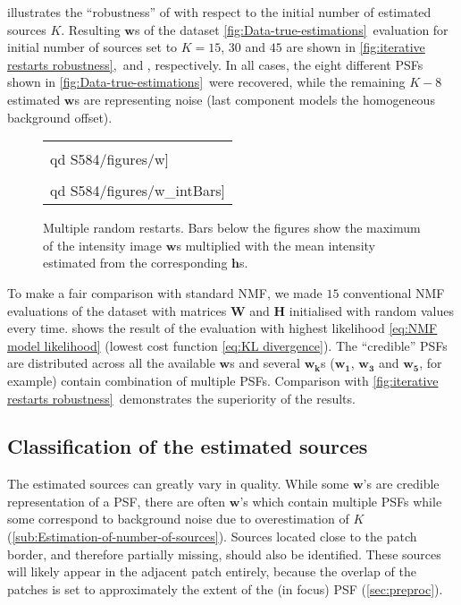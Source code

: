  illustrates the ``robustness'' of \inmf{} with respect to the initial number of estimated sources $K$. Resulting $\bm{w}$s of the dataset \autoref{fig:Data-true-estimations}\aaa\ evaluation for initial number of sources set to $K=15$, $30$ and $45$ are shown in \autoref{fig:iterative restarts robustness}\aaa,\bbb\ and \ccc, respectively. In all cases, the eight different PSFs shown in \autoref{fig:Data-true-estimations}\bbb\ were recovered, while the remaining $K-8$ estimated $\bm{w}$s are representing noise (last component models the homogeneous background offset).

\begin{figure}[!htb]
	\newcommand{\widthfig}{.95\textwidth}
	\newcommand{\barspace}{-.7cm}
	\centering
	\begin{tabular}{l}
		\texttt{[image: \\qd S584/figures/w]} \vspace{\barspace}\tabularnewline
		\texttt{[image: \\qd S584/figures/w\_intBars]}\tabularnewline
	\end{tabular}
	\caption{Multiple random restarts. Bars below the figures show the maximum of the intensity image $\bm{w}$s multiplied with the mean intensity estimated from the corresponding $\bm{h}$s.}
	\label{fig:random restarts}
\end{figure}

To make a fair comparison with standard NMF, we made $15$ conventional NMF evaluations of the dataset with matrices $\bm{W}$ and $\bm{H}$ initialised with random values every time.  shows the result of the evaluation with highest likelihood \autoref{eq:NMF model likelihood} (lowest cost function \autoref{eq:KL divergence}). The ``credible'' PSFs are distributed across all the available $\bm{w}$s and several $\bm{w_k}$s ($\bm{w_{1}}$, $\bm{w_{3}}$ and $\bm{w_{5}}$, for example) contain combination of multiple PSFs. Comparison with \autoref{fig:iterative restarts robustness}\aaa\ demonstrates the superiority of the \inmf{} results. 


\subsection{Classification of the estimated sources\label{sub:Classification-of-sources}}

The estimated sources can greatly vary in quality. While some $\bm{w}$'s are credible representation of a PSF, there are often $\bm{w}$'s which contain multiple PSFs while some correspond to background noise due to overestimation of $K$ (\autoref{sub:Estimation-of-number-of-sources}). Sources located close to the patch border, and therefore partially missing, should also be identified. These sources will likely appear in the adjacent patch entirely, because the overlap of the patches is set to approximately the extent of the (in focus) PSF (\autoref{sec:preproc}).

